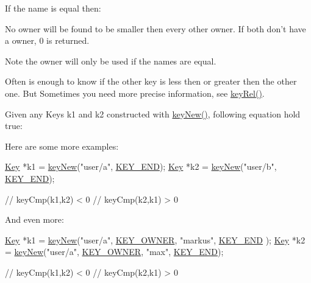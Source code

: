 If the name is equal then\-:


\begin{DoxyItemize}
\item No owner will be found to be smaller then every other owner. If both don't have a owner, 0 is returned.
\end{DoxyItemize}

\begin{DoxyNote}{Note}
the owner will only be used if the names are equal.
\end{DoxyNote}
Often is enough to know if the other key is less then or greater then the other one. But Sometimes you need more precise information, see \hyperlink{group__keytest_ga6bb0f95ac34ce9c42d61bb35a76139d0}{key\-Rel()}.

Given any Keys k1 and k2 constructed with \hyperlink{group__key_gad23c65b44bf48d773759e1f9a4d43b89}{key\-New()}, following equation hold true\-:


\begin{DoxyCodeInclude}
\end{DoxyCodeInclude}
 Here are some more examples\-: 
\begin{DoxyCode}
\hyperlink{classkdb_1_1Key_a5679f5cae63caddd64a60388b9cc77fa}{Key} *k1 = \hyperlink{group__key_gad23c65b44bf48d773759e1f9a4d43b89}{keyNew}(\textcolor{stringliteral}{"user/a"}, \hyperlink{group__key_gga91fb3178848bd682000958089abbaf40aa8adb6fcb92dec58fb19410eacfdd403}{KEY\_END});
\hyperlink{classkdb_1_1Key_a5679f5cae63caddd64a60388b9cc77fa}{Key} *k2 = \hyperlink{group__key_gad23c65b44bf48d773759e1f9a4d43b89}{keyNew}(\textcolor{stringliteral}{"user/b"}, \hyperlink{group__key_gga91fb3178848bd682000958089abbaf40aa8adb6fcb92dec58fb19410eacfdd403}{KEY\_END});

\textcolor{comment}{// keyCmp(k1,k2) < 0}
\textcolor{comment}{// keyCmp(k2,k1) > 0}
\end{DoxyCode}


And even more\-: 
\begin{DoxyCode}
\hyperlink{classkdb_1_1Key_a5679f5cae63caddd64a60388b9cc77fa}{Key} *k1 = \hyperlink{group__key_gad23c65b44bf48d773759e1f9a4d43b89}{keyNew}(\textcolor{stringliteral}{"user/a"}, \hyperlink{group__key_gga91fb3178848bd682000958089abbaf40a77ca60362fa8daca8d5347db4385068b}{KEY\_OWNER}, \textcolor{stringliteral}{"markus"}, \hyperlink{group__key_gga91fb3178848bd682000958089abbaf40aa8adb6fcb92dec58fb19410eacfdd403}{KEY\_END}
      );
\hyperlink{classkdb_1_1Key_a5679f5cae63caddd64a60388b9cc77fa}{Key} *k2 = \hyperlink{group__key_gad23c65b44bf48d773759e1f9a4d43b89}{keyNew}(\textcolor{stringliteral}{"user/a"}, \hyperlink{group__key_gga91fb3178848bd682000958089abbaf40a77ca60362fa8daca8d5347db4385068b}{KEY\_OWNER}, \textcolor{stringliteral}{"max"}, \hyperlink{group__key_gga91fb3178848bd682000958089abbaf40aa8adb6fcb92dec58fb19410eacfdd403}{KEY\_END});

\textcolor{comment}{// keyCmp(k1,k2) < 0}
\textcolor{comment}{// keyCmp(k2,k1) > 0}
\end{DoxyCode}


